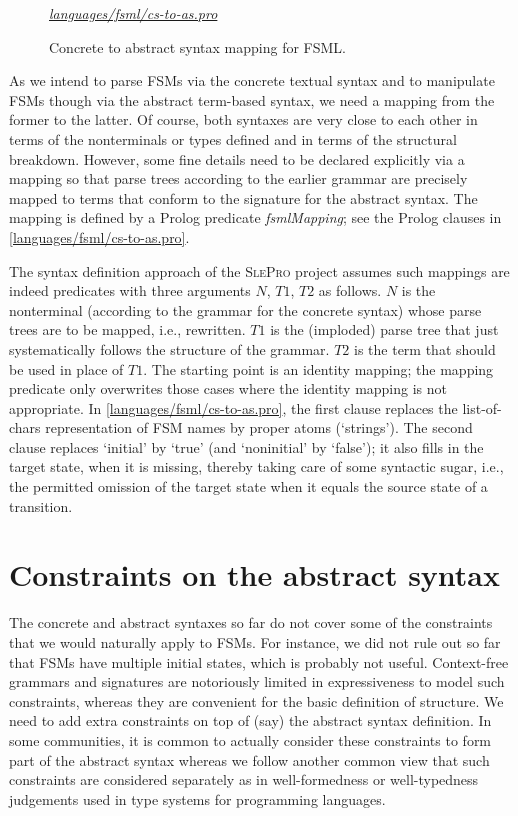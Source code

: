 \documentclass[preprint,authoryear,12pt]{noelsarticle}
\newcommand{\m}[1]{\ensuremath{\mathit{#1}}}
\newcommand{\slepro}{\textsc{SlePro}}
\newcommand{\codefigure}[3]{
\begin{figure}[t!]
\begin{boxedminipage}{\hsize}
\mbox{}\hfill{}{\small\textit{\href{http://github.com/slebok/slepro/tree/master/#2}{#2}}}

\end{boxedminipage}
\caption{#1.}
\label{#2}
\medskip
\end{figure}}
\begin{document}
\codefigure{%
Concrete to abstract syntax mapping for FSML}{%
languages/fsml/cs-to-as.pro}{%
prolog}

As we intend to parse FSMs via the concrete textual syntax and to
manipulate FSMs though via the abstract term-based syntax, we need a
mapping from the former to the latter. Of course, both syntaxes are
very close to each other in terms of the nonterminals or types defined
and in terms of the structural breakdown. However, some fine details
need to be declared explicitly via a mapping so that parse trees
according to the earlier grammar are precisely mapped to terms that
conform to the signature for the abstract syntax. The mapping is
defined by a Prolog predicate \emph{fsmlMapping}; see the Prolog
clauses in \autoref{languages/fsml/cs-to-as.pro}.

The syntax definition approach of the \slepro{} project assumes such
mappings are indeed predicates with three arguments \m{N}, \m{T1},
\m{T2} as follows. \m{N} is the nonterminal (according to the grammar
for the concrete syntax) whose parse trees are to be mapped, i.e.,
rewritten. \m{T1} is the (imploded) parse tree that just
systematically follows the structure of the grammar. \m{T2} is the
term that should be used in place of \m{T1}. The starting point is an
identity mapping; the mapping predicate only overwrites those cases
where the identity mapping is not appropriate. In
\autoref{languages/fsml/cs-to-as.pro}, the first clause replaces the
list-of-chars representation of FSM names by proper atoms (`strings').
The second clause replaces `initial' by `true' (and `noninitial' by
`false'); it also fills in the target state, when it is missing,
thereby taking care of some syntactic sugar, i.e., the permitted
omission of the target state when it equals the source state of a
transition.


\section{Constraints on the abstract syntax}
\label{S:ok}

The concrete and abstract syntaxes so far do not cover some of the
constraints that we would naturally apply to FSMs. For instance, we
did not rule out so far that FSMs have multiple initial states, which
is probably not useful. Context-free grammars and signatures are
notoriously limited in expressiveness to model such constraints,
whereas they are convenient for the basic definition of structure. We
need to add extra constraints on top of (say) the abstract syntax
definition. In some communities, it is common to actually consider
these constraints to form part of the abstract syntax whereas we
follow another common view that such constraints are considered
separately as in well-formedness or well-typedness judgements used in
type systems for programming languages.
\end{document}
